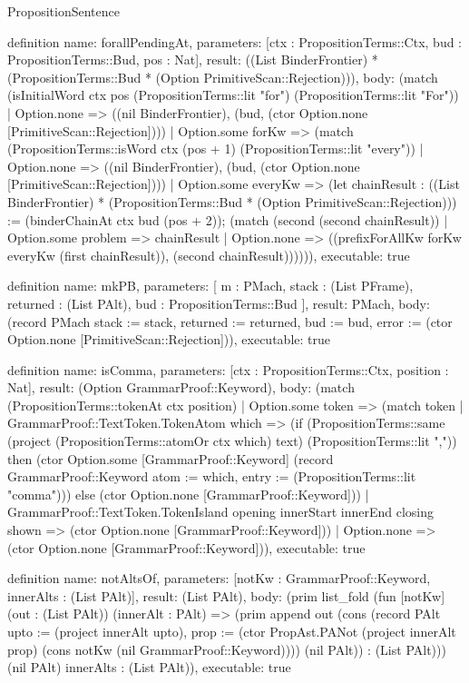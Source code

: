 \begin{lexlean}{PropositionSentence}
\begin{semanticmodule}
definition{
  name: forallPendingAt,
  parameters: [ctx : PropositionTerms::Ctx, bud : PropositionTerms::Bud, pos : Nat],
  result: ((List BinderFrontier) * (PropositionTerms::Bud * (Option PrimitiveScan::Rejection))),
  body: (match (isInitialWord ctx pos (PropositionTerms::lit "for") (PropositionTerms::lit "For"))
    | Option.none => ((nil BinderFrontier), (bud, (ctor Option.none [PrimitiveScan::Rejection])))
    | Option.some forKw => (match (PropositionTerms::isWord ctx (pos + 1) (PropositionTerms::lit "every"))
        | Option.none => ((nil BinderFrontier), (bud, (ctor Option.none [PrimitiveScan::Rejection])))
        | Option.some everyKw => (let chainResult : ((List BinderFrontier) * (PropositionTerms::Bud * (Option PrimitiveScan::Rejection))) := (binderChainAt ctx bud (pos + 2)); (match (second (second chainResult))
            | Option.some problem => chainResult
            | Option.none => ((prefixForAllKw forKw everyKw (first chainResult)), (second chainResult)))))),
  executable: true
}

definition{
  name: mkPB,
  parameters: [
    m : PMach,
    stack : (List PFrame),
    returned : (List PAlt),
    bud : PropositionTerms::Bud
  ],
  result: PMach,
  body: (record PMach {stack := stack, returned := returned, bud := bud, error := (ctor Option.none [PrimitiveScan::Rejection])}),
  executable: true
}

definition{
  name: isComma,
  parameters: [ctx : PropositionTerms::Ctx, position : Nat],
  result: (Option GrammarProof::Keyword),
  body: (match (PropositionTerms::tokenAt ctx position)
    | Option.some token => (match token
        | GrammarProof::TextToken.TokenAtom which => (if (PropositionTerms::same (project (PropositionTerms::atomOr ctx which) text) (PropositionTerms::lit ",")) then (ctor Option.some [GrammarProof::Keyword] (record GrammarProof::Keyword {atom := which, entry := (PropositionTerms::lit "comma")})) else (ctor Option.none [GrammarProof::Keyword]))
        | GrammarProof::TextToken.TokenIsland opening innerStart innerEnd closing shown => (ctor Option.none [GrammarProof::Keyword]))
    | Option.none => (ctor Option.none [GrammarProof::Keyword])),
  executable: true
}

definition{
  name: notAltsOf,
  parameters: [notKw : GrammarProof::Keyword, innerAlts : (List PAlt)],
  result: (List PAlt),
  body: (prim list_fold (fun [notKw] (out : (List PAlt)) (innerAlt : PAlt) => (prim append out (cons (record PAlt {upto := (project innerAlt upto), prop := (ctor PropAst.PANot (project innerAlt prop) (cons notKw (nil GrammarProof::Keyword)))}) (nil PAlt)) : (List PAlt))) (nil PAlt) innerAlts : (List PAlt)),
  executable: true
}


\end{semanticmodule}
\end{lexlean}
